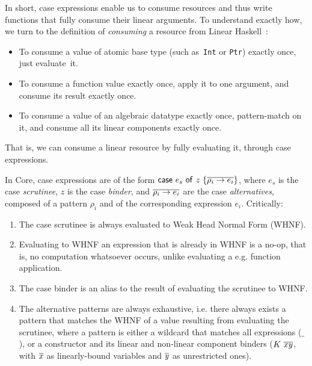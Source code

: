 \documentclass[acmsmall, screen, review]{acmart}
\newcommand{\tensor}{\otimes}
\newcommand{\ccase}[2]{\mathsf{case}~#1~\mathsf{of}~#2}
\begin{document}
In short, case expressions enable us to consume resources and thus write
functions that fully consume their linear arguments. To understand exactly how,
we turn to the definition of \emph{consuming} a resource from Linear
Haskell~\cite{cite:linearhaskell}:
\begin{itemize}
    \item To consume a value of atomic base type (such as~\texttt{Int} or
        \texttt{Ptr}) exactly once, just evaluate~it.
    \item To consume a function value exactly once, apply it to one argument,
        and consume its result exactly once.
    \item To consume a value of an algebraic datatype exactly once,
        pattern-match on it, and consume all its linear components exactly once.
\end{itemize}
That is, we can consume a linear resource by fully evaluating it, through case
expressions.


In Core, case expressions are of the form $\ccase{e_s}{z~\{\ov{\rho_i \to e_i}\}}$,
where $e_s$ is the case \emph{scrutinee}, $z$ is the case \emph{binder}, and
$\overline{\rho_i \to e_i}$ are the case \emph{alternatives}, composed of a pattern
$\rho_i$ and of the corresponding expression $e_i$. Critically:
\begin{enumerate}
\item The case scrutinee is always evaluated to Weak Head Normal Form (WHNF).

\item Evaluating to WHNF an expression that is already in WHNF is a no-op, that is,
no computation whatsoever occurs, unlike evaluating a e.g. function application.

\item The case binder is an alias to the result of evaluating the scrutinee to WHNF.

\item The alternative patterns are always exhaustive, i.e. there always exists
a pattern that matches the WHNF of a value resulting from evaluating the
scrutinee, where a pattern is either a wildcard that matches all expressions
($\_$), or a constructor and its linear and non-linear component binders
($K~\overline{x}\overline{y}$, with $\overline{x}$ as linearly-bound variables and $\overline{y}$ as
unrestricted ones).

\end{enumerate}
\end{document}
